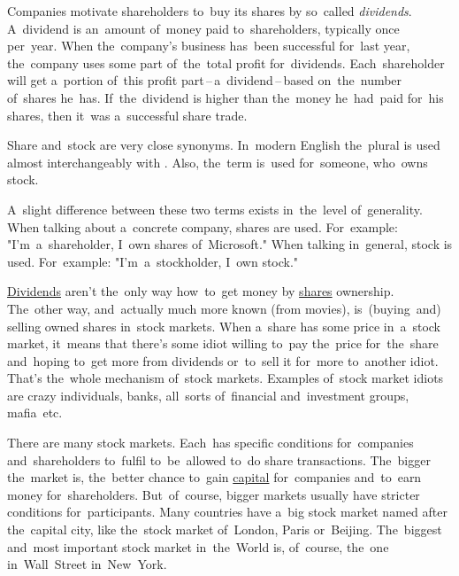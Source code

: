 Companies motivate shareholders to~buy its shares by so~called \textit{dividends}.
A~dividend is an~amount of~money paid to~shareholders, typically once per~year.
When the~company's business has~been successful for~last year, the~company uses some part of~the~total profit for~dividends.
Each~shareholder will get a~portion of~this profit part\,--\,a~dividend\,--\,based on~the~number of~shares he~has.
If~the~dividend is higher than the~money he~had~paid for~his shares, then it~was a~successful share trade.

Share and~stock are very close synonyms.
In~modern English the~plural  is used almost interchangeably with .
Also, the~term  is~used for~someone, who~owns stock.

A~slight difference between these two terms exists in~the~level of~generality.
When talking about a~concrete company, shares are used.
For~example:
"I'm~a~shareholder, I~own shares of~Microsoft."
When talking in~general, stock is used.
For~example:
"I'm~a~stockholder, I~own stock."

\hyperref[share]{Dividends} aren't the~only way how~to~get money by \hyperref[share]{shares} ownership.
The~other way, and~actually much more known (from movies), is~(buying~and) selling owned shares in~stock markets.
When a~share has some price in~a~stock market, it~means that there's some idiot willing to~pay the~price for~the~share and~hoping to~get more from dividends or~to~sell it for~more to~another idiot.
That's the~whole mechanism of~stock markets.
Examples of~stock market idiots are crazy individuals, banks, all~sorts of~financial and~investment groups, mafia~etc.

There are many stock markets.
Each~has specific conditions for~companies and~shareholders to~fulfil to~be~allowed to~do share transactions.
The~bigger the~market is, the~better chance to~gain \hyperref[capital]{capital} for~companies and~to~earn money for~shareholders.
But~of~course, bigger markets usually have stricter conditions for~participants.
Many countries have a~big stock market named after the~capital city, like the~stock market of~London, Paris or~Beijing.
The~biggest and~most important stock market in~the~World is, of~course, the~one in~Wall~Street in~New~York.
\newpage

